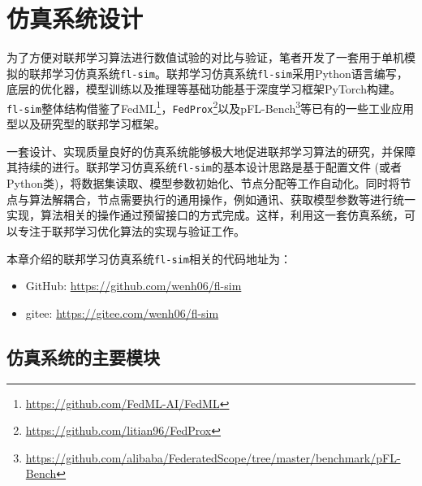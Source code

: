 \newcommand{\urlgithub}{\url{https://github.com/wenh06/fl-sim}}
\newcommand{\urlgitee}{\url{https://gitee.com/wenh06/fl-sim}}

\section{仿真系统设计}
\label{sec:chap5-design}


为了方便对联邦学习算法进行数值试验的对比与验证，笔者开发了一套用于单机模拟的联邦学习仿真系统\texttt{fl-sim}。联邦学习仿真系统\texttt{fl-sim}采用Python语言编写，底层的优化器，模型训练以及推理等基础功能基于深度学习框架PyTorch\cite{pytorch}构建。\texttt{fl-sim}整体结构借鉴了FedML\footnote{\url{https://github.com/FedML-AI/FedML}}\parencite{he_2020_fedml}，\texttt{FedProx}\footnote{\url{https://github.com/litian96/FedProx}}\parencite{sahu2018fedprox}以及pFL-Bench\footnote{\url{https://github.com/alibaba/FederatedScope/tree/master/benchmark/pFL-Bench}}\parencite{chen_2022_pfl_bench}等已有的一些工业应用型以及研究型的联邦学习框架。

一套设计、实现质量良好的仿真系统能够极大地促进联邦学习算法的研究，并保障其持续的进行。联邦学习仿真系统\texttt{fl-sim}的基本设计思路是基于配置文件 (或者Python类)，将数据集读取、模型参数初始化、节点分配等工作自动化。同时将节点与算法解耦合，节点需要执行的通用操作，例如通讯、获取模型参数等进行统一实现，算法相关的操作通过预留接口的方式完成。这样，利用这一套仿真系统，可以专注于联邦学习优化算法的实现与验证工作。

本章介绍的联邦学习仿真系统\texttt{fl-sim}相关的代码地址为：
\begin{itemize}
    \item GitHub: \urlgithub
    \item gitee: \urlgitee
\end{itemize}

\subsection{仿真系统的主要模块}

